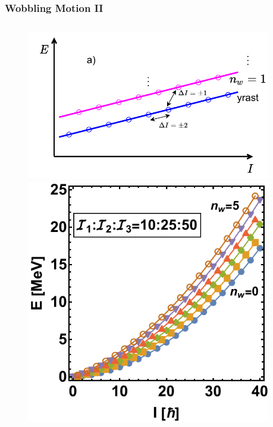 \documentclass{beamer}
\begin{document}
\begin{frame}
	\frametitle{Wobbling Motion II}
	\vspace{-0.4cm}
	\begin{columns}
		\begin{column}{0.6\textwidth}
			\begin{figure}
				\centering
				\includegraphics[scale=0.45]{figures/wobbling_n_schematic-1.pdf}
				\includegraphics[scale=0.48]{figures/wobblingFreq-evenA.pdf}
			\end{figure}
		\end{column}
		\begin{column}{0.4\textwidth}

\end{column}
\end{columns}
\end{frame}
\end{document}
